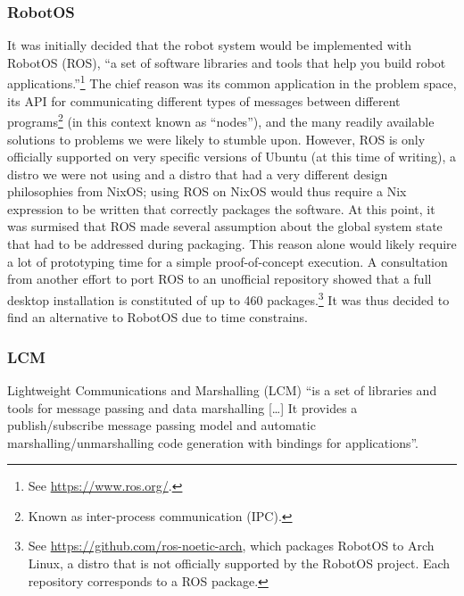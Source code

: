 \subsubsection{RobotOS}
\label{sec:ROS}
It was initially decided that the robot system would be implemented with RobotOS (ROS), ``a set of software libraries and tools that help you build robot applications.''\footnote{See \href{https://www.ros.org/}{https://www.ros.org/}.}
The chief reason was its common application in the problem space,
its API for communicating different types of messages between different programs\footnote{Known as inter-process communication (IPC).} (in this context known as ``nodes''),
and the many readily available solutions to problems we were likely to stumble upon.
However, ROS is only officially supported on very specific versions of Ubuntu (at this time of writing),
a distro we were not using and a distro that had a very different design philosophies from NixOS;
using ROS on NixOS would thus require a Nix expression to be written that correctly packages the software.
At this point, it was surmised that ROS made several assumption about the global system state that had to be addressed during packaging.
This reason alone would likely require a lot of prototyping time for a simple proof-of-concept execution.
A consultation from another effort to port ROS to an unofficial repository showed that a full desktop installation is constituted of up to 460 packages.\footnote{See \href{https://github.com/ros-noetic-arch}{https://github.com/ros-noetic-arch}, which packages RobotOS to Arch Linux, a distro that is not officially supported by the RobotOS project. Each repository corresponds to a ROS package.}
It was thus decided to find an alternative to RobotOS due to time constrains.

\subsubsection{LCM}
\label{sec:LCM}
Lightweight Communications and Marshalling (LCM) ``is a set of libraries and tools for message passing and data marshalling [\ldots] It provides a publish/subscribe message passing model and automatic marshalling/unmarshalling code generation with bindings for applications''.


